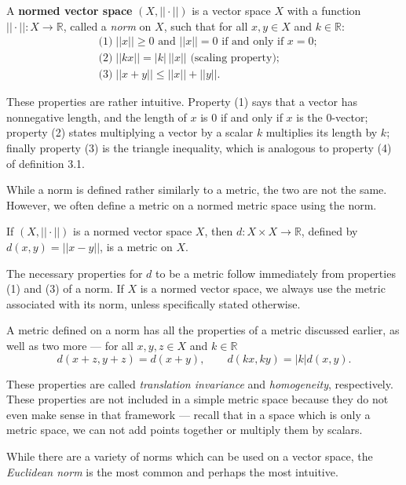 \begin{defn}
A \textbf{normed vector space} $(X, ||\cdot||)$ is a vector space $X$ with a function $||\cdot||:X \rightarrow \mathbb{R}$, called a \textit{norm} on $X$, such that for all $x,y \in X$ and $k \in \mathbb{R}$:
\begin{align*}
&\textrm{(1)}\; ||x|| \geq 0 \textrm{ and } ||x|| = 0 \textrm{ if and only if } x=0;\\
&\textrm{(2)}\; ||kx|| = |k|\,||x|| \textrm{ (scaling property)};\\
&\textrm{(3)}\; ||x + y|| \leq ||x|| + ||y||.
\end{align*}
\end{defn}

These properties are rather intuitive.  Property (1) says that a vector has nonnegative length, and the length of $x$ is 0 if and only if $x$ is the 0-vector; property (2) states multiplying a vector by a scalar $k$ multiplies its length by $k$; finally property (3) is the triangle inequality, which is analogous to property (4) of definition 3.1.

While a norm is defined rather similarly to a metric, the two are not the same.  However, we often define a metric on a normed metric space using the norm.

\begin{prop}
If $(X, ||\cdot||)$ is a normed vector space $X$, then $d: X \times X \rightarrow \mathbb{R}$, defined by $d(x,y) = ||x - y||$, is a metric on $X$.
\end{prop}

The necessary properties for $d$ to be a metric follow immediately from properties (1) and (3) of a norm.  If $X$ is a normed vector space, we always use the metric associated with its norm, unless specifically stated otherwise.

A metric defined on a norm has all the properties of a metric discussed earlier, as well as two more --- for all $x, y, z \in X$ and $k \in \mathbb{R}$
\[d(x+z, y+z) = d(x+y), \qquad d(kx, ky) = |k|d(x,y).\]

These properties are called \textit{translation invariance} and \textit{homogeneity}, respectively.  These properties are not included in a simple metric space because they do not even make sense in that framework --- recall that in a space which is only a metric space, we can not add points together or multiply them by scalars.

While there are a variety of norms which can be used on a vector space, the \textit{Euclidean norm} is the most common and perhaps the most intuitive.

